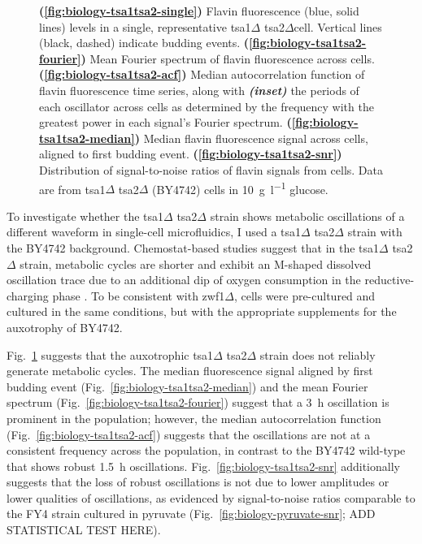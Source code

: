 \begin{figure}
  \caption{
    \textbf{(\ref{fig:biology-tsa1tsa2-single})}
    Flavin fluorescence (blue, solid lines) levels in a single, representative tsa1$\Delta$ tsa2$\Delta$cell.
    Vertical lines (black, dashed) indicate budding events.
    \textbf{(\ref{fig:biology-tsa1tsa2-fourier})}
    Mean Fourier spectrum of flavin fluorescence across cells.
    \textbf{(\ref{fig:biology-tsa1tsa2-acf})}
    Median autocorrelation function of flavin fluorescence time series, along with \textit{\textbf{(inset)}} the periods of each oscillator across cells as determined by the frequency with the greatest power in each signal's Fourier spectrum.
    \textbf{(\ref{fig:biology-tsa1tsa2-median})}
    Median flavin fluorescence signal across cells, aligned to first budding event.
    \textbf{(\ref{fig:biology-tsa1tsa2-snr})}
    Distribution of signal-to-noise ratios of flavin signals from cells.
    Data are from tsa1$\Delta$ tsa2$\Delta$ (BY4742) cells in \SI{10}{\gram~\litre^{-1}} glucose.
  }
  \label{fig:biology-tsa1tsa2}
\end{figure}


To investigate whether the tsa1$\Delta$ tsa2$\Delta$ strain shows metabolic oscillations of a different waveform in single-cell microfluidics, I used a tsa1$\Delta$ tsa2$\Delta$ strain with the BY4742 background.
Chemostat-based studies suggest that in the tsa1$\Delta$ tsa2$\Delta$ strain, metabolic cycles are shorter and exhibit an M-shaped dissolved oscillation trace due to an additional dip of oxygen consumption in the reductive-charging phase \parencite{caustonMetabolicCyclesYeast2015}.
To be consistent with zwf1$\Delta$, cells were pre-cultured and cultured in the same conditions, but with the appropriate supplements for the auxotrophy of BY4742.
%

Fig.\ \ref{fig:biology-tsa1tsa2} suggests that the auxotrophic tsa1$\Delta$ tsa2$\Delta$ strain does not reliably generate metabolic cycles.
The median fluorescence signal aligned by first budding event (Fig.\ \ref{fig:biology-tsa1tsa2-median}) and the mean Fourier spectrum (Fig.\ \ref{fig:biology-tsa1tsa2-fourier}) suggest that a \SI{3}{\hour} oscillation is prominent in the population;
however, the median autocorrelation function (Fig.\ \ref{fig:biology-tsa1tsa2-acf}) suggests that the oscillations are not at a consistent frequency across the population, in contrast to the BY4742 wild-type that shows robust \SI{1.5}{\hour} oscillations.
Fig.\ \ref{fig:biology-tsa1tsa2-snr} additionally suggests that the loss of robust oscillations is not due to lower amplitudes or lower qualities of oscillations, as evidenced by signal-to-noise ratios comparable to the FY4 strain cultured in pyruvate (Fig.\ \ref{fig:biology-pyruvate-snr}; ADD STATISTICAL TEST HERE).

